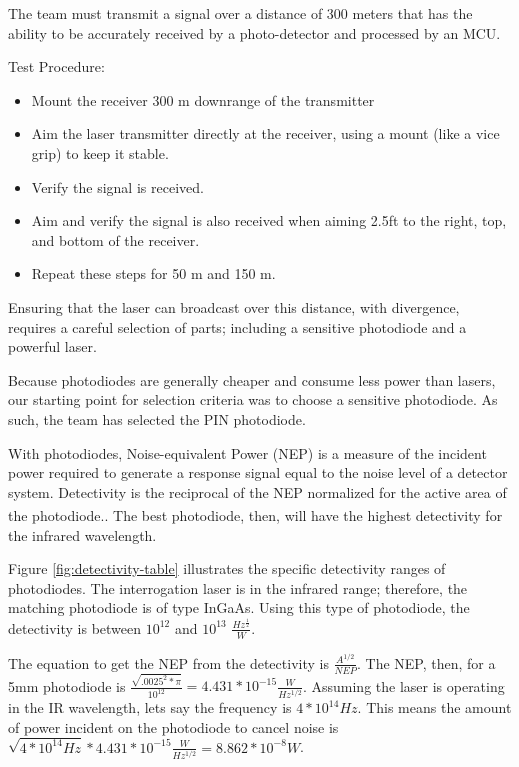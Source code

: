 \documentclass[openbib,letterpaper,10pt]{article}
\begin{document}
\begin{spacing}{1.15}
The team must transmit a signal over a distance of 300 meters that has the ability to be accurately received by a photo-detector and processed by an MCU. 

Test Procedure:
 
\begin{itemize}
	\item Mount the receiver 300 m downrange of the transmitter
	\item Aim the laser transmitter directly at the receiver, using a mount (like a vice grip) to keep it stable. 
	\item Verify the signal is received.
	\item Aim and verify the signal is also received when aiming 2.5ft to the right, top, and bottom of the receiver. 
	\item Repeat these steps for 50 m and 150 m. 
\end{itemize}

Ensuring that the laser can broadcast over this distance, with divergence, requires a careful selection of parts; including a sensitive photodiode and a powerful laser. 

Because photodiodes are generally cheaper and consume less power than lasers, our starting point for selection criteria was to choose a sensitive photodiode. As such, the team has selected the PIN photodiode. 

With photodiodes, Noise-equivalent Power (NEP) is a measure of the incident power required to generate a response signal equal to the noise level of a detector system. Detectivity is the reciprocal of the NEP normalized for the active area of the photodiode.\textsuperscript{\cite{Microphotonics}}. The best photodiode, then, will have the highest detectivity for the infrared wavelength.  



Figure \ref{fig:detectivity-table} illustrates the specific detectivity ranges of photodiodes. The interrogation laser is in the infrared range; therefore, the matching photodiode is of type InGaAs. Using this type of photodiode, the detectivity is between $10^{12}$ and $10^{13}$ $\frac{Hz^{\frac{1}{2}}}{W}$. 

The equation to get the NEP from the detectivity is $\frac{A^{1/2}}{NEP}$. The NEP, then, for a 5mm photodiode is $\frac{\sqrt{.0025^2 * \pi}}{10^{12}} = 4.431 * 10^{-15} \frac{W}{Hz^{1/2}}$. Assuming the laser is operating in the IR wavelength, lets say the frequency is $4*10^{14} Hz$. This means the amount of power incident on the photodiode to cancel noise is $\sqrt{4*10^{14}Hz} * 4.431 * 10^{-15} \frac{W}{Hz^{1/2}} = 8.862*10^{-8} W$. 


\end{spacing}
\end{document}
